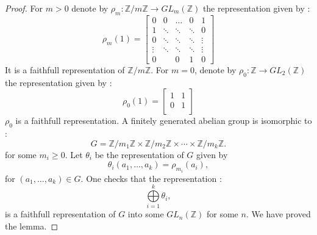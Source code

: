 \documentclass[10pt,a4paper]{amsart}
\newcommand{\Z}{ {\mathbb Z} }
\begin{document}
\begin{proof}
For $m>0$ denote by $\rho_m: \Z/m\Z \to GL_m(\Z)$ the representation given by :
$$ \rho_m(1)=   \begin{bmatrix}
  0& 0 	& \dots &0&1\\
1&\ddots &\ddots &\ddots&0  \\
0&\ddots & \ddots & \ddots& \vdots \\
\vdots& \ddots & \ddots & \ddots &\vdots\\
0& &0 &1 &  0\end{bmatrix}
$$
It is a faithfull representation of $\Z/m\Z$. For $m=0$, denote by $\rho_0 : \Z \to GL_2(\Z)$ the representation given by :
$$\rho_0(1)= \begin{bmatrix}
  1& 1\\
0&1 \\
\end{bmatrix} $$
$\rho_0$ is a faithfull representation. A finitely generated abelian group is isomorphic to :
 $$G=\Z/{m_1}\Z\times \Z/m_2\Z \times \cdots \times \Z/m_k \Z.$$
for some $m_i\geq 0$. Let $\theta_i$ be the representation of $G$ given by $$\theta_i(a_1,\dots , a_k)=\rho_{m_i}(a_i),$$ for $(a_1,\dots,a_k)\in G$. One checks that the representation : $$\overset{k}{\underset{i=1}{\bigoplus}} \theta_i,$$
is a faithfull representation of $G$ into some $GL_n(\Z)$ for some $n$. We have proved the lemma.
\end{proof}
\end{document}

